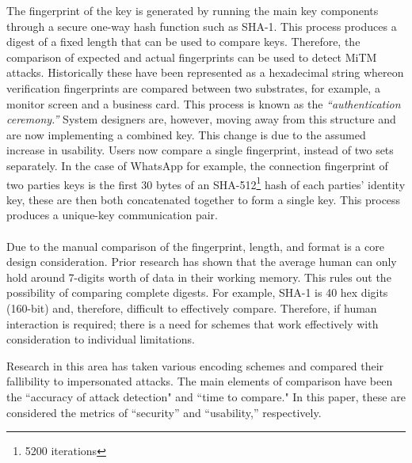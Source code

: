 The fingerprint of the key is generated by running the main key components through a secure one-way hash function such as SHA-1. This process produces a digest of a fixed length that can be used to compare keys. Therefore, the comparison of expected and actual fingerprints can be used to detect MiTM attacks.
Historically these have been represented as a hexadecimal string whereon verification fingerprints are compared between two substrates, for example, a monitor screen and a business card.
This process is known as the \textit{``authentication ceremony.''} System designers are, however, moving away from this structure and are now implementing a combined key. This change is due to the assumed increase in usability. Users now compare a single fingerprint, instead of two sets separately. In the case of WhatsApp for example, the connection fingerprint of two parties keys is the first 30 bytes of an SHA-512\footnote{5200 iterations} hash of each parties' identity key, these are then both concatenated together to form a single key\cite{whatsapp2017paper}. This process produces a unique-key communication pair.
\\\\
Due to the manual comparison of the fingerprint, length, and format is a core design consideration. Prior research has shown that the average human can only hold around 7-digits worth of data in their working memory\cite{miller1956magical}. This rules out the possibility of comparing complete digests. For example, SHA-1 is 40 hex digits (160-bit) and, therefore, difficult to effectively compare. Therefore, if human interaction is required; there is a need for schemes that work effectively with consideration to individual limitations.

Research in this area has taken various encoding schemes and compared their fallibility to impersonated attacks. The main elements of comparison have been the ``accuracy of attack detection" and ``time to compare." In this paper, these are considered the metrics of ``security'' and ``usability,'' respectively.

